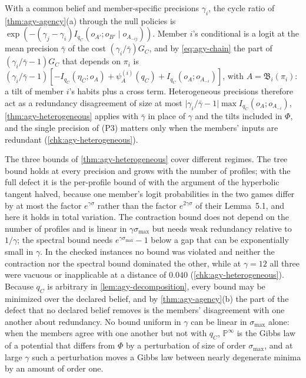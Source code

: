 \begin{remark}\label{rem:agy-precisions}
With a common belief and member-specific precisions $\gamma_i$, the cycle ratio of \cref{thm:agy-agency}(a) through the null policies is $\exp(-(\gamma_j-\gamma_i)I_{q_C}(o_{A'};o_{B'}\mid o_{A_{-ij}}))$. Member $i$'s conditional is a logit at the mean precision $\bar\gamma$ of the cost $(\gamma_i/\bar\gamma)G_C$, and by \eqref{eq:agy-chain} the part of $(\gamma_i/\bar\gamma-1)G_C$ that depends on $\pi_i$ is $(\gamma_i/\bar\gamma-1)[-I_{q_C}(\eta_C;o_A)+\psi^{(i)}_A(q_C)+I_{q_C}(o_A;o_{A_{-i}})]$, with $A=\mathfrak B_i(\pi_i)$: a tilt of member $i$'s habits plus a cross term. Heterogeneous precisions therefore act as a redundancy disagreement of size at most $\lvert\gamma_i/\bar\gamma-1\rvert\max I_{q_C}(o_A;o_{A_{-i}})$, \cref{thm:agy-heterogeneous} applies with $\bar\gamma$ in place of $\gamma$ and the tilts included in $\Phi$, and the single precision of (P3) matters only when the members' inputs are redundant (\cref{chk:agy-heterogeneous}).
\end{remark}

The three bounds of \cref{thm:agy-heterogeneous} cover different regimes. The tree bound holds at every precision and grows with the number of profiles; with the full defect it is the per-profile bound of \citet[Corollary~5.2(ii) of the arXiv version]{candogan2013dynamics} with the argument of the hyperbolic tangent halved, because one member's logit probabilities in the two games differ by at most the factor $e^{\gamma\sigma}$ rather than the factor $e^{2\gamma\sigma}$ of their Lemma~5.1, and here it holds in total variation. The contraction bound does not depend on the number of profiles and is linear in $\gamma\sigma_{\max}$ but needs weak redundancy relative to $1/\gamma$; the spectral bound needs $e^{\gamma\sigma_{\max}}-1$ below a gap that can be exponentially small in $\gamma$. In the checked instances no bound was violated and neither the contraction nor the spectral bound dominated the other, while at $\gamma=12$ all three were vacuous or inapplicable at a distance of $0.040$ (\cref{chk:agy-heterogeneous}). Because $q_C$ is arbitrary in \cref{lem:agy-decomposition}, every bound may be minimized over the declared belief, and by \cref{thm:agy-agency}(b) the part of the defect that no declared belief removes is the members' disagreement with one another about redundancy. No bound uniform in $\gamma$ can be linear in $\sigma_{\max}$ alone: when the members agree with one another but not with $q_C$, $\mathbb P^\infty$ is the Gibbs law of a potential that differs from $\Phi$ by a perturbation of size of order $\sigma_{\max}$, and at large $\gamma$ such a perturbation moves a Gibbs law between nearly degenerate minima by an amount of order one.

